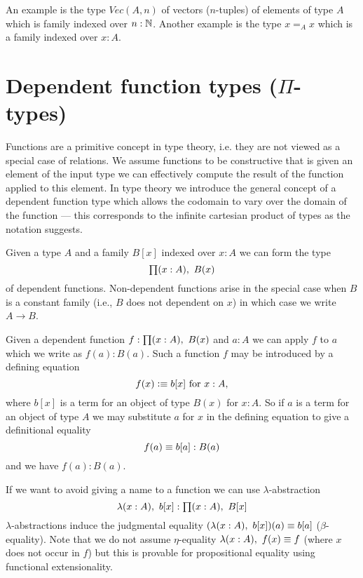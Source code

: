 {An example is the type $Vec(A,n)$ of
vectors ($n$-tuples) of elements of type $A$ which is family indexed
over $n : \mathbb{N}$. Another example is the type $x =_A x$ which is a
family indexed over $x : A$. 

\section{Dependent function types (\texorpdfstring{$\Pi$}{Π}-types)}
\label{sec:pi-types}

Functions are a primitive concept in type theory, i.e. they are not
viewed as a special case of relations. We assume functions to be
constructive that is given an element of the input type we can
effectively compute the result of the function applied to this
element. In type theory we introduce the general concept of a
dependent function type which allows the codomain to vary over the
domain of the function --- this corresponds to the infinite cartesian
product of types as the notation suggests. 

Given a type $A$
and a family $B[x]$ indexed over $x:A$ we can form the type
\[\prd{x:A}B(x)\] of dependent functions. Non-dependent functions arise
in the special case when $B$ is a constant family (i.e., $B$ does not
dependent on $x$) in which case we write $A \to B$.


Given a dependent function $f : \prd{x:A}B(x)$ and $a : A$ we can
apply $f$ to $a$ which we write as $f(a) : B(a)$.  Such a function $f$ may be introduced by a defining equation
  \[ f(x)\vcentcolon\equiv b[x]\mbox{ for } x:A,\]
where $b[x]$ is a term for an object of type $B(x)$ for $x:A$. So if $a$ is a term for an object of type $A$ we may substitute $a$ for $x$ in the defining equation to give a definitional equality
  \[ f(a)\equiv b[a]:B(a)\]
and we have $f(a):B(a)$. 

If we want to avoid giving a name to a function we can use
$\lambda$-abstraction 
\[\lam{x:A}b[x] : \prd{x:A}B[x]\]
$\lambda$-abstractions induce the judgmental equality
$(\lam{x:A}b[x])(a) \jdeq b[a]$ ($\beta$-equality). Note that
we do not assume $\eta$-equality $\lam{x:A} f(x) \jdeq f$ (where
$x$ does not occur in $f$) but this is provable for propositional
equality using functional extensionality.

}
